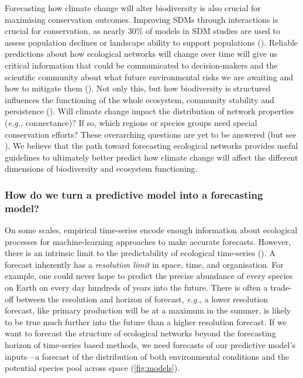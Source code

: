 \begin{refsection}
Forecasting how climate change will alter biodiversity is also crucial
for maximising conservation outcomes. Improving SDMs through
interactions is crucial for conservation, as nearly 30\% of models in
SDM studies are used to assess population declines or landscape ability
to support populations (\cite{Araujo2019StaDis}). Reliable predictions
about how ecological networks will change over time will give us
critical information that could be communicated to decision-makers and
the scientific community about what future environmental risks we are
awaiting and how to mitigate them (\cite{Kindsvater2018OveDat}). Not only
this, but how biodiversity is structured influences the functioning of
the whole ecosystem, community stability and persistence
(\cite{Thompson2012FooWeb, Stouffer2010UndFoo}). Will climate change
impact the distribution of network properties (\emph{e.g.,} connectance)? If so,
which regions or species groups need special conservation efforts? These
overarching questions are yet to be answered (but see
\cite{Albouy2013ProCli, Kortsch2015CliCha, Hattab2016ForFin}). We believe
that the path toward forecasting ecological networks provides useful
guidelines to ultimately better predict how climate change will affect
the different dimensions of biodiversity and ecosystem functioning.

\subsubsection{How do we turn a predictive model into a forecasting
model?}\label{how-do-we-turn-a-predictive-model-into-a-forecasting-model}

On some scales, empirical time-series encode enough information about
ecological processes for machine-learning approaches to make accurate
forecasts. However, there is an intrinsic limit to the predictability of
ecological time-series (\cite{Pennekamp2019IntPre}). A forecast inherently
has a \emph{resolution limit} in space, time, and organisation. For
example, one could never hope to predict the precise abundance of every
species on Earth on every day hundreds of years into the future. There
is often a trade-off between the resolution and horizon of forecast,
\emph{e.g.,} a lower resolution forecast, like primary production will be at a
maximum in the summer, is likely to be true much further into the future
than a higher resolution forecast. If we want to forecast the structure
of ecological networks beyond the forecasting horizon of time-series
based methods, we need forecasts of our predictive model's inputs---a
forecast of the distribution of both environmental conditions and the
potential species pool across space (\autoref{fig:models}).


\end{refsection}
